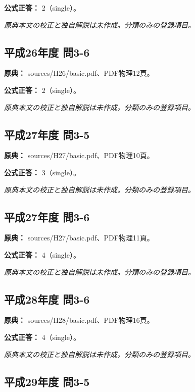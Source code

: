 \textbf{公式正答：} 2（single）。

\par\textit{原典本文の校正と独自解説は未作成。分類のみの登録項目。}

\subsection{平成26年度 問3-6}
\label{q:h26-reg-basic-3-6}

\noindent\textbf{原典：} sources/H26/basic.pdf、PDF物理12頁。

\textbf{公式正答：} 2（single）。

\par\textit{原典本文の校正と独自解説は未作成。分類のみの登録項目。}

\subsection{平成27年度 問3-5}
\label{q:h27-reg-basic-3-5}

\noindent\textbf{原典：} sources/H27/basic.pdf、PDF物理10頁。

\textbf{公式正答：} 3（single）。

\par\textit{原典本文の校正と独自解説は未作成。分類のみの登録項目。}

\subsection{平成27年度 問3-6}
\label{q:h27-reg-basic-3-6}

\noindent\textbf{原典：} sources/H27/basic.pdf、PDF物理11頁。

\textbf{公式正答：} 4（single）。

\par\textit{原典本文の校正と独自解説は未作成。分類のみの登録項目。}

\subsection{平成28年度 問3-6}
\label{q:h28-reg-basic-3-6}

\noindent\textbf{原典：} sources/H28/basic.pdf、PDF物理16頁。

\textbf{公式正答：} 4（single）。

\par\textit{原典本文の校正と独自解説は未作成。分類のみの登録項目。}

\subsection{平成29年度 問3-5}
\label{q:h29-reg-basic-3-5}


